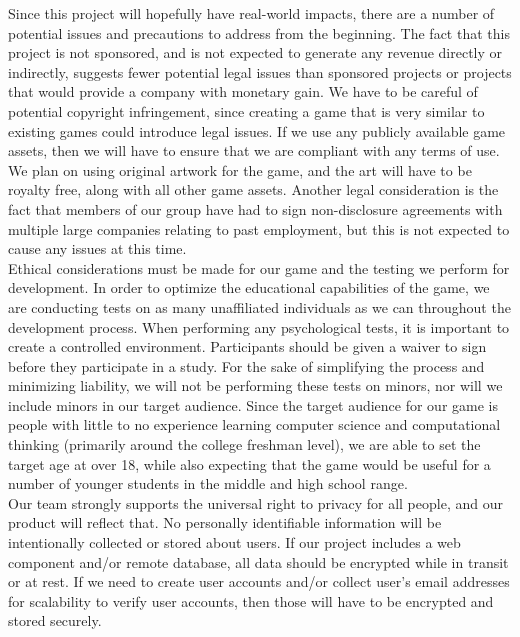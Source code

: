 Since this project will hopefully have real-world impacts, there are a number of
potential issues and precautions to address from the beginning. The fact that
this project is not sponsored, and is not expected to generate any revenue
directly or indirectly, suggests fewer potential legal issues than sponsored
projects or projects that would provide a company with monetary gain. We have to
be careful of potential copyright infringement, since creating a game that is
very similar to existing games could introduce legal issues. If we use any
publicly available game assets, then we will have to ensure that we are
compliant with any terms of use. We plan on using original artwork for the game,
and the art will have to be royalty free, along with all other game assets.
Another legal consideration is the fact that members of our group have had to
sign non-disclosure agreements with multiple large companies relating to past
employment, but this is not expected to cause any issues at this time.\\

Ethical considerations must be made for our game and the testing we perform for
development. In order to optimize the educational capabilities of the game, we
are conducting tests on as many unaffiliated individuals as we can throughout
the development process. When performing any psychological tests, it is
important to create a controlled environment. Participants should be given a
waiver to sign before they participate in a study. For the sake of simplifying
the process and minimizing liability, we will not be performing these tests on
minors, nor will we include minors in our target audience. Since the target
audience for our game is people with little to no experience learning computer
science and computational thinking (primarily around the college freshman
level), we are able to set the target age at over 18, while also expecting that
the game would be useful for a number of younger students in the middle and high
school range.\\

Our team strongly supports the universal right to privacy for all people, and
our product will reflect that. No personally identifiable information will be
intentionally collected or stored about users. If our project includes a web
component and/or remote database, all data should be encrypted while in transit
or at rest. If we need to create user accounts and/or collect user’s email
addresses for scalability to verify user accounts, then those will have to be
encrypted and stored securely.
